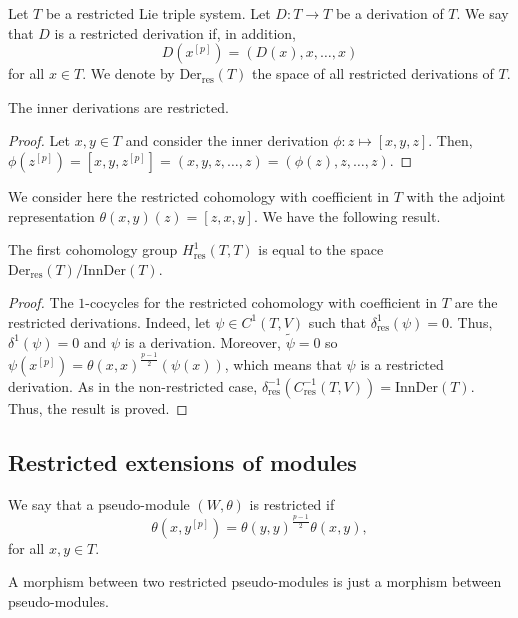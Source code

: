 \documentclass[11pt, twoside]{article}
\begin{document}
\begin{defi}
    Let $T$ be a restricted Lie triple system. Let $D:T\to T$ be a derivation of $T$. We say that $D$ is a restricted derivation if, in addition, $$D(x^{[p]})=(D(x),x,\ldots,x) $$ for all $x\in T$. We denote by $\mathrm{Der}_\mathrm{res}(T) $ the space of all restricted derivations of $T$.
\end{defi}

\begin{lem}
    The inner derivations are restricted.
\end{lem}

\begin{proof}
    Let $x,y\in T$ and consider the inner derivation $\phi:z\mapsto [x,y,z] $. Then, $\phi(z^{[p]})= [x,y,z^{[p]}]=(x,y,z,\ldots,z) = (\phi(z),z,\ldots,z) $.
\end{proof}

We consider here the restricted cohomology with coefficient in $T$ with the adjoint representation $\theta(x,y)(z)= [z,x,y] $.  We have the following result.

\begin{prop}
  The first cohomology group $H_\mathrm{res}^1(T,T) $ is equal to the space $\mathrm{Der}_\mathrm{res}(T)/\mathrm{InnDer}(T) $.
\end{prop}

\begin{proof}
    The $1$-cocycles for the restricted cohomology with coefficient in $T$ are the restricted derivations. Indeed, let $\psi\in C^1(T,V)$ such that $\delta_\mathrm{res}^1(\psi)=0 $. Thus, $\delta^1(\psi)=0 $ and $\psi $ is a derivation. Moreover, $\tilde{\psi}=0 $ so $\psi(x^{[p]})= \theta(x,x)^\frac{p-1}{2}(\psi(x)) $, which means that $\psi$ is a restricted derivation. As in the non-restricted case, $\delta^{-1}_\mathrm{res}(C^{-1}_\mathrm{res}(T,V))= \mathrm{InnDer}(T) $. Thus, the result is proved.
\end{proof}

\subsection{Restricted extensions of modules}

\begin{defi}
    We say that a pseudo-module $(W,\theta)$ is restricted if $$\theta(x,y^{[p]})= \theta(y,y)^\frac{p-1}{2}\theta(x,y), $$ for all $x,y\in T$.
\end{defi}

A morphism between two restricted pseudo-modules is just a morphism between pseudo-modules.
\end{document}
